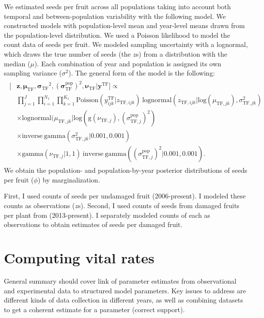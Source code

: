 \documentclass[12pt, oneside, titlepage]{article}   	%
\begin{document}
We estimated seeds per fruit across all populations taking into account both temporal and between-population variability with the following model. We constructed models with population-level mean and year-level means drawn from the population-level distribution. We used a Poisson likelihood to model the count data of seeds per fruit. We modeled sampling uncertainty with a lognormal, which draws the true number of seeds (the $z$s) from a distribution with the median ($\mu$). Each combination of year and population is assigned its own sampling variance ($\sigma^2$). The general form of the model is the following: 
%
\begin{align}
  \begin{split}
  [ &  \bm{z} ,  \bm{\mu_{\mathrm{TF}}} ,  \bm{\sigma_{\mathrm{TF}}}^2 , ( \bm{\sigma^\mathrm{pop}_{\mathrm{TF}}})^2, \bm{\nu_{\mathrm{TF}}}  |  \bm{y^{\mathrm{TF}}} ]  \propto  \\  
 	     & \prod_{j=1}^{J} \prod_{i=1}^{N_1}  \prod_{k=1}^{K_1}  \mathrm{Poisson} ( y^\mathrm{TF}_{ijk} | z_{\mathrm{TF},ijk} )\ \mathrm{lognormal} ( z_{\mathrm{TF},ijk} | \mathrm{log}(\mu_{\mathrm{TF},jk}), \sigma^2_{\mathrm{TF},jk} )  \\
	     & \times \mathrm{lognormal} ( \mu_{\mathrm{TF},jk} | \mathrm{log}(\mathrm{g}(\nu_{\mathrm{TF},j}), (\sigma^\mathrm{pop}_{\mathrm{TF},j} )^2)  \\
	     & \times \mathrm{inverse\ gamma} ( \sigma^2_{\mathrm{TF},jk}  | 0.001, 0.001 ) \\
	     & \times \mathrm{gamma} (\nu_{\mathrm{TF},j} | 1 , 1)\  \mathrm{inverse\ gamma} ( (\sigma^\mathrm{pop}_{\mathrm{TF},j} )^2 | 0.001, 0.001 ) .
  \end{split}
\end{align}
%
We obtain the population- and population-by-year posterior distributions of seeds per fruit ($\phi$) by marginalization. 

First, I used counts of seeds per undamaged fruit (2006-present). I modeled these counts as observations ($z$s). Second, I used counts of seeds from damaged fruits per plant from (2013-present). I separately modeled counts of each as observations to obtain estimates of seeds per damaged fruit.

\section{Computing vital rates}

General summary should cover link of parameter estimates from observational and experimental data to structured model parameters. Key issues to address are different kinds of data collection in different years, as well as combining datasets to get a coherent estimate for a parameter (correct support).
\end{document}
